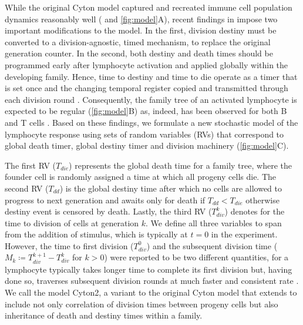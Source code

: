 \documentclass[11pt, a4paper]{article}
\begin{document}
While the original Cyton model captured and recreated immune cell population dynamics reasonably well (\cite{Hawkins.2007} and \cref{fig:model}A), recent findings in \cite{Heinzel.2016} impose two important modifications to the model. In the first, division destiny must be converted to a division-agnostic, timed mechanism, to replace the original generation counter. In the second, both destiny and death times should be programmed early after lymphocyte activation and applied globally within the developing family. Hence, time to destiny and time to die operate as a timer that is set once and the changing temporal register copied and transmitted through each division round \parencite{Heinzel.2016}. Consequently, the family tree of an activated lymphocyte is expected to be regular (\cref{fig:model}B) as, indeed, has been observed for both B and T cells \parencite{Hawkins.2009, Marchingo.2016}. Based on these findings, we formulate a new stochastic model of the lymphocyte response using sets of random variables (RVs) that correspond to global death timer, global destiny timer and division machinery (\cref{fig:model}C).

The first RV ($T_{die}$) represents the global death time for a family tree, where the founder cell is randomly assigned a time at which all progeny cells die. The second RV ($T_{dd}$) is the global destiny time after which no cells are allowed to progress to next generation and awaits only for death if $T_{dd} < T_{die}$ otherwise destiny event is censored by death. Lastly, the third RV ($T_{div}^k$) denotes for the time to division of cells at generation $k$. We define all three variables to span from the addition of stimulus, which is typically at $t=0$ in the experiment. However, the time to first division ($T_{div}^0$) and the subsequent division time ($M_k \coloneqq T_{div}^{k+1} - T_{div}^k$ for $k>0$) were reported to be two different quantities, for a lymphocyte typically takes longer time to complete its first division but, having done so, traverses subsequent division rounds at much faster and consistent rate \parencite{Gett.1998, Gett.2000}. We call the model Cyton2, a variant to the original Cyton model \parencite{Hawkins.2007} that extends to include not only correlation of division times between progeny cells but also inheritance of death and destiny times within a family.
\end{document}
